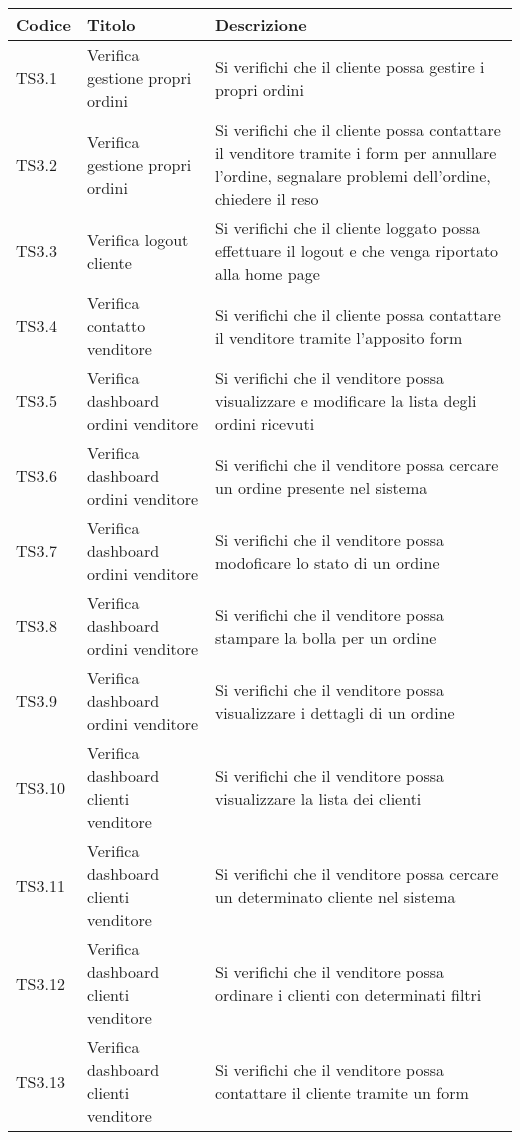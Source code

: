 \begin{center}
	\begin{longtable}{p{1cm}|p{6.85cm}|p{7cm}|}
	\hline
	\rowcolor{lighter-grayer}
	\textbf{Codice} & \textbf{Titolo} & \textbf{Descrizione} \\
	\hline
	\endfirsthead



	\hline
	TS3.1 & Verifica gestione propri ordini & Si verifichi che il cliente possa gestire i propri ordini  \\
	TS3.2 & Verifica gestione propri ordini & Si verifichi che il cliente possa contattare il venditore tramite i form per annullare l'ordine, segnalare problemi dell'ordine, chiedere il reso \\
	TS3.3 & Verifica logout cliente & Si verifichi che il cliente loggato possa effettuare il logout e che venga riportato alla home page \\
	TS3.4 & Verifica contatto venditore & Si verifichi che il cliente possa contattare il venditore tramite l'apposito form  \\
	TS3.5 & Verifica dashboard ordini venditore & Si verifichi che il venditore possa visualizzare e modificare la lista degli ordini ricevuti \\
	TS3.6 & Verifica dashboard ordini venditore & Si verifichi che il venditore possa cercare un ordine presente nel sistema \\
	TS3.7 & Verifica dashboard ordini venditore & Si verifichi che il venditore possa modoficare lo stato di un ordine  \\
	TS3.8 & Verifica dashboard ordini venditore & Si verifichi che il venditore possa stampare la bolla per un ordine  \\
	TS3.9 & Verifica dashboard ordini venditore & Si verifichi che il venditore possa visualizzare i dettagli di un ordine \\
	TS3.10 & Verifica dashboard clienti venditore & Si verifichi che il venditore possa visualizzare la lista dei clienti \\
	TS3.11 & Verifica dashboard clienti venditore & Si verifichi che il venditore possa cercare un determinato cliente nel sistema \\
	TS3.12 & Verifica dashboard clienti venditore & Si verifichi che il venditore possa ordinare i clienti con determinati filtri \\
	TS3.13 & Verifica dashboard clienti venditore & Si verifichi che il venditore possa contattare il cliente tramite un form \\

\end{longtable}
\end{center}
